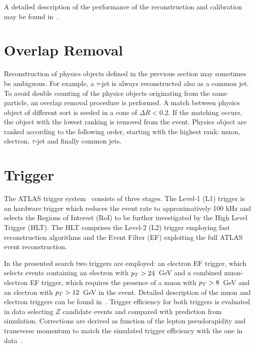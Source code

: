 A detailed description of the performance of the  \met reconstruction and calibration may be found in~\cite{ETMISS2}.


\section{Overlap Removal} \label{sec:olr}
Reconstruction of  physics objects defined in the previous section may sometimes
be ambiguous. For example, a $\tau$-jet is always reconstructed also as a common jet.
To avoid double counting of the physics objects originating from the same particle, an overlap removal procedure
is performed. A match between physics object of different sort is seeded  in a cone of $\Delta R <0.2$.
If  the matching occurs, the object with the lowest ranking is removed from the event. 
Physics object are ranked according to the following order, starting with the highest rank: muon, electron, $\tau$-jet 
and finally common jets.

\section{Trigger}
The ATLAS trigger system~\cite{trigger} consists of three stages. The Level-1 (L1) trigger is an
hardware trigger which reduces the event rate to approximatively 100 kHz and selects the Regions of
Interest (RoI) to be further investigated by the High Level Trigger (HLT). The HLT
comprises the Level-2 (L2) trigger employing fast reconstruction algorithms and the
Event Filter (EF) exploiting the full ATLAS event reconstruction.

In the presented search two triggers are employed: an electron EF trigger, which selects events containing 
an electron with $p_{T} >24 $~GeV and a combined muon-electron EF trigger, which requires the presence of a muon with $p_{T} > 8$~GeV and 
an electron with $p_{T} > 12$~GeV in the event. Detailed description of the muon and electron triggers can be found in~\cite{triggermu,triggere}.
Trigger efficiency for both triggers is evaluated in data selecting $Z$ candidate events and compared with prediction from simulation. Corrections are derived 
as function of the lepton pseudorapidity and transverse  momentum to match the simulated  trigger efficiency 
with the one in  data~\cite{triggermu,triggere}.

